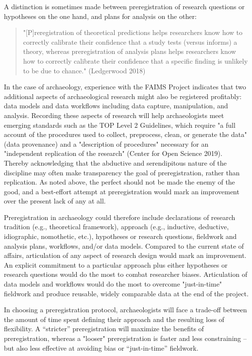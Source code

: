 \documentclass[article]{sa}
\begin{document}
A distinction is sometimes made between preregistration of research
questions or hypotheses on the one hand, and plans for analysis on the
other:

\begin{quote}
    


"{[}P{]}reregistration of theoretical predictions helps researchers know
how to correctly calibrate their confidence that a study tests (versus
informs) a theory, whereas preregistration of analysis plans helps
researchers know how to correctly calibrate their confidence that a
specific finding is unlikely to be due to chance." (Ledgerwood 2018)

\end{quote}

In the case of archaeology, experience with the FAIMS Project indicates
that two additional aspects of archaeological research might also be
registered profitably: data models and data workflows including data
capture, manipulation, and analysis. Recording these aspects of research
will help archaeologists meet emerging standards such as the TOP Level 2
Guidelines, which require "a full account of the procedures used to
collect, preprocess, clean, or generate the data" (data provenance) and
a "description of procedures" necessary for an "independent replication
of the research" (Center for Open Science 2019). Thereby acknowledging
that the abductive and serendipitous nature of the discipline may often
make transparency the goal of preregistration, rather than replication.
As noted above, the perfect should not be made the enemy of the good,
and a best-effort attempt at preregistration would mark an improvement
over the present lack of any at all.

Preregistration in archaeology could therefore include declarations of
research tradition (e.g., theoretical framework), approach (e.g.,
inductive, deductive, idiographic, nomothetic, etc.), hypotheses or
research questions, fieldwork and analysis plans, workflows, and/or data
models. Compared to the current state of affairs, articulation of any
aspect of research design would mark an improvement. An explicit
commitment to a particular approach plus either hypotheses or research
questions would do the most to combat researcher biases. Articulation of
data models and workflows would do the most to overcome "just-in-time"
fieldwork and produce reusable, widely comparable data at the end of the
project.

In choosing a preregistration protocol, archaeologists will face a
trade-off between the amount of time spent defining their approach and
the resulting loss of flexibility. A ``stricter'' preregistration will
maximize the benefits of preregistration, whereas a "looser"
preregistration is faster and less constraining -- but also less
effective at avoiding bias or ``just-in-time'' fieldwork.
\end{document}
